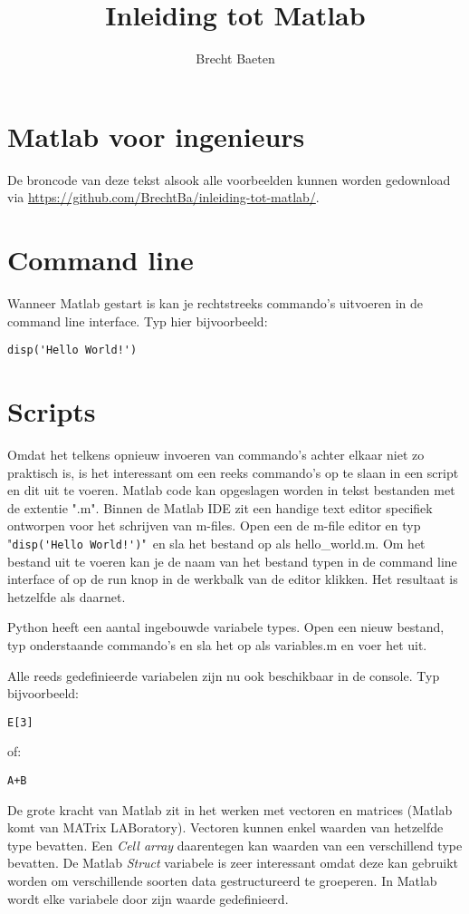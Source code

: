 \documentclass[11pt,twoside]{article}
\title{Inleiding tot Matlab}
\author{Brecht Baeten}
\begin{document}
	\maketitle

	\section{Matlab voor ingenieurs}
De broncode van deze tekst alsook alle voorbeelden kunnen worden gedownload via \url{https://github.com/BrechtBa/inleiding-tot-matlab/}.

	\section{Command line}
Wanneer Matlab gestart is kan je rechtstreeks commando's uitvoeren in de command line interface. Typ hier bijvoorbeeld:
\begin{lstlisting}
disp('Hello World!')
\end{lstlisting}

 	\section{Scripts}
Omdat het telkens opnieuw invoeren van commando's achter elkaar niet zo praktisch is, is het interessant om een reeks commando's op te slaan in een script en dit uit te voeren. Matlab code kan opgeslagen worden in tekst bestanden met de extentie "\textsf{.m}". Binnen de Matlab IDE zit een handige text editor specifiek ontworpen voor het schrijven van m-files. Open een de m-file editor en typ "\lstinline{disp('Hello World!')}"\ en sla het bestand op als \textsf{hello\_world.m}. Om het bestand uit te voeren kan je de naam van het bestand typen in de command line interface of op de \textsf{run} knop in de werkbalk van de editor klikken. Het resultaat is hetzelfde als daarnet.

Python heeft een aantal ingebouwde variabele types. Open een nieuw bestand, typ onderstaande commando's en sla het op als \textsf{variables.m} en voer het uit.


Alle reeds gedefinieerde variabelen zijn nu ook beschikbaar in de console. Typ bijvoorbeeld:
\begin{lstlisting}
E[3]
\end{lstlisting}
of:
\begin{lstlisting}
A+B
\end{lstlisting}

De grote kracht van Matlab zit in het werken met vectoren en matrices (Matlab komt van MATrix LABoratory). Vectoren kunnen enkel waarden van hetzelfde type bevatten. Een \emph{Cell array} daarentegen kan waarden van een verschillend type bevatten. De Matlab \emph{Struct} variabele is zeer interessant omdat deze kan gebruikt worden om verschillende soorten data gestructureerd te groeperen. In Matlab wordt elke variabele door zijn waarde gedefinieerd.
\end{document}
